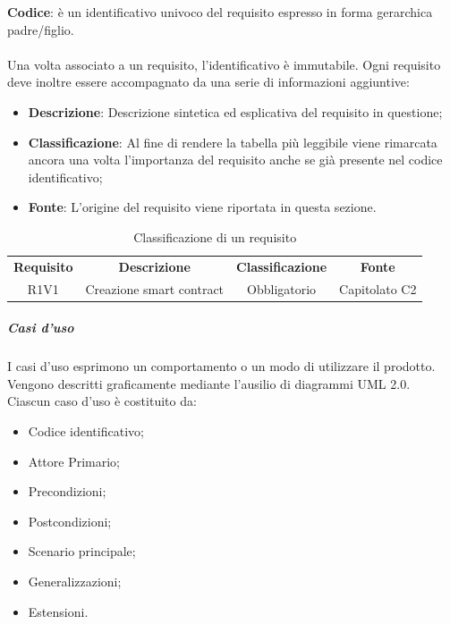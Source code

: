             \textbf{Codice}: è un identificativo univoco del requisito espresso in forma gerarchica padre/figlio.
            \\
            \\
            Una volta associato a un requisito, l'identificativo è immutabile.
            Ogni requisito deve inoltre essere accompagnato da una serie di informazioni aggiuntive:
            \begin{itemize}
                \item \textbf{Descrizione}: Descrizione sintetica ed esplicativa del requisito in questione;
                \item \textbf{Classificazione}: Al fine di rendere la tabella più leggibile viene rimarcata ancora una volta l'importanza del requisito anche se già presente nel codice identificativo;
                \item \textbf{Fonte}: L'origine del requisito viene riportata in questa sezione.
            \end{itemize}
            
            \begin{table}[H]
              \centering
              \renewcommand{\arraystretch}{1.8}
              \begin{tabular}{cccc}
                \rowcolor[HTML]{125E28} 
                \color[HTML]{FFFFFF}\textbf{Requisito}
              & \color[HTML]{FFFFFF}\textbf{Descrizione} 
              & \color[HTML]{FFFFFF}\textbf{Classificazione} 
              & \color[HTML]{FFFFFF}\textbf{Fonte}\\
            
                R1V1  &  Creazione smart contract  &  Obbligatorio  &  Capitolato C2\\    
            
              \end{tabular}
              \caption{Classificazione di un requisito}
            \end{table}
                        
            \subparagraph{Casi d'uso} \label{subparagraph:Casi d'uso}
            I casi d'uso esprimono un comportamento o un modo di utilizzare il prodotto.\\
            Vengono descritti graficamente mediante l'ausilio di diagrammi UML 2.0.\\
            Ciascun caso d'uso è costituito da:
            \begin{itemize}
                \item Codice identificativo;
                \item Attore Primario;
                \item Precondizioni;
                \item Postcondizioni;
                \item Scenario principale;
                \item Generalizzazioni;
                \item Estensioni.
            \end{itemize}

